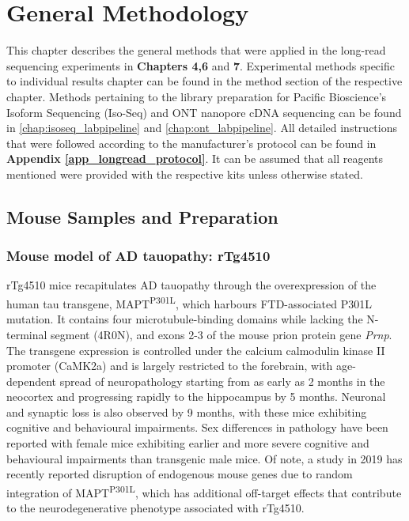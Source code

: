 \chapter{General Methodology}\label{ch: general methodology}

This chapter describes the general methods that were applied in the long-read sequencing experiments in \textbf{Chapters 4,6} and \textbf{7}. Experimental methods specific to individual results chapter can be found in the method section of the respective chapter. Methods pertaining to the library preparation for Pacific Bioscience's Isoform Sequencing (Iso-Seq) and ONT nanopore cDNA sequencing can be found in \cref{chap:isoseq_labpipeline} and \cref{chap:ont_labpipeline}. All detailed instructions that were followed according to the manufacturer's protocol can be found in \textbf{Appendix \ref{app_longread_protocol}}. It can be assumed that all reagents mentioned were provided with the respective kits unless otherwise stated.

\section{Mouse Samples and Preparation}

\subsection{Mouse model of AD tauopathy: rTg4510} 
rTg4510 mice recapitulates AD tauopathy through the overexpression of the human tau transgene, MAPT\textsuperscript{P301L}, which harbours FTD-associated P301L mutation. It contains four microtubule-binding domains while lacking the N-terminal segment (4R0N), and exons 2-3 of the mouse prion protein gene \textit{Prnp}. The transgene expression is controlled under the calcium calmodulin kinase II promoter (CaMK2a) and is largely restricted to the forebrain, with age-dependent spread of neuropathology starting from as early as 2 months in the neocortex and progressing rapidly to the hippocampus by 5 months. Neuronal and synaptic loss is also observed by 9 months, with these mice exhibiting cognitive and behavioural impairments. Sex differences in pathology have been reported with female mice exhibiting earlier and more severe cognitive and behavioural impairments than transgenic male mice\cite{M2011}. Of note, a study in 2019 has recently reported disruption of endogenous mouse genes due to random integration of MAPT\textsuperscript{P301L}, which has additional off-target effects that contribute to the neurodegenerative phenotype associated with rTg4510\cite{Gamache2019}. 
 

